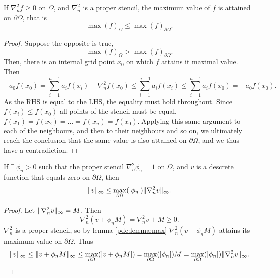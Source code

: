 \begin{lemma}\label{pde:lemma:max}
If $\nabla_n^2 f \geq 0$ on $\Omega$, and $\nabla_n^2$ is a proper stencil, the maximum value of $f$ is attained on $\partial \Omega$, that is
$$
\max(f)_\Omega \leq \max(f)_{\partial \Omega}.
$$
\end{lemma}
\begin{proof}
Suppose the opposite is true,
$$
\max(f)_\Omega > \max(f)_{\partial \Omega}.
$$
Then, there is an internal grid point $x_0$ on which $f$ attains it maximal value.
Then
\begin{equation}
  -a_0 f(x_0)
  = \sum_{i=1}^{n-1} a_i f(x_i) - \nabla_n^2 f(x_0)
  \leq \sum_{i=1}^{n-1} a_i f(x_i)
  \leq \sum_{i=1}^{n-1} a_i f(x_0)
  = -a_0 f(x_0).
\end{equation}
As the RHS is equal to the LHS, the equality must hold throughout.
Since $f(x_i) \leq f(x_0)$ all points of the stencil must be equal, $f(x_1) = f(x_2) = \dots = f(x_n) = f(x_0)$.
Applying this same argument to each of the neighbours, and then to their neighbours and so on, we ultimately reach the conclusion that the same value is also attained on $\partial \Omega$, and we thus have a contradiction.
\end{proof}

\begin{lemma}\label{pde:lemma:bound}
  If $\exists ~ \phi_n > 0$ such that the proper stencil $\nabla_n^2 \phi_n = 1$ on $\Omega$, and $v$ is a descrete function that equals zero on $\partial \Omega$, then
  \begin{equation}
    \lVert v \rVert_\infty \leq \max_{\partial\Omega}(\lvert \phi_n \rvert)
    \lVert \nabla_n^2 v \rVert_\infty.
  \end{equation}
\end{lemma}
\begin{proof}

Let $\lVert \nabla_n^2 v \rVert_\infty = M$.
Then
$$
\nabla_n^2 (v + \phi_n M) = \nabla_n^2 v +  M \geq 0.
$$
$\nabla_n^2$ is a proper stencil, so by lemma \ref{pde:lemma:max} $\nabla_n^2 (v + \phi_n M)$ attains its maximum value on $\partial \Omega$.
Thus
$$
\lVert v \rVert_\infty
\leq \lVert v + \phi_n M \rVert_\infty
\leq \max_{\partial \Omega}(\lvert v + \phi_n M\rvert)
= \max_{\partial\Omega} (\lvert \phi_n \rvert) M
= \max_{\partial\Omega} (\lvert \phi_n \rvert) \lVert \nabla_n^2 v \rVert_\infty.
$$
\end{proof}

